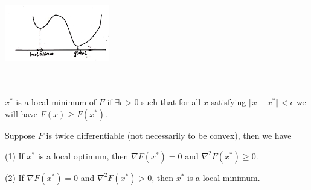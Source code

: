 \begin{marginfigure}
	\centering
	\includegraphics[width=1.8in,height=1.8in]{figures/ch08/figure1111_1.png}
\end{marginfigure}

\begin{definition}
	$x^*$ is a local minimum of $F$ if $\exists \epsilon >0$ such that for all $x$ satisfying $\Vert x - x^*\Vert < \epsilon$ we will have $F(x) \geq F(x^*)$.
\end{definition}

\begin{theorem}
	Suppose $F$ is twice differentiable (not necessarily to be convex), then we have
	
	(1) If $x^*$ is a local optimum, then $\nabla F(x^*) = 0$ and $\nabla^2F(x^*)\geq 0$.
	
	(2) If $\nabla F(x^*) = 0$ and $\nabla^2F(x^*)> 0$, then $x^*$ is a local minimum. 
\end{theorem}

%

